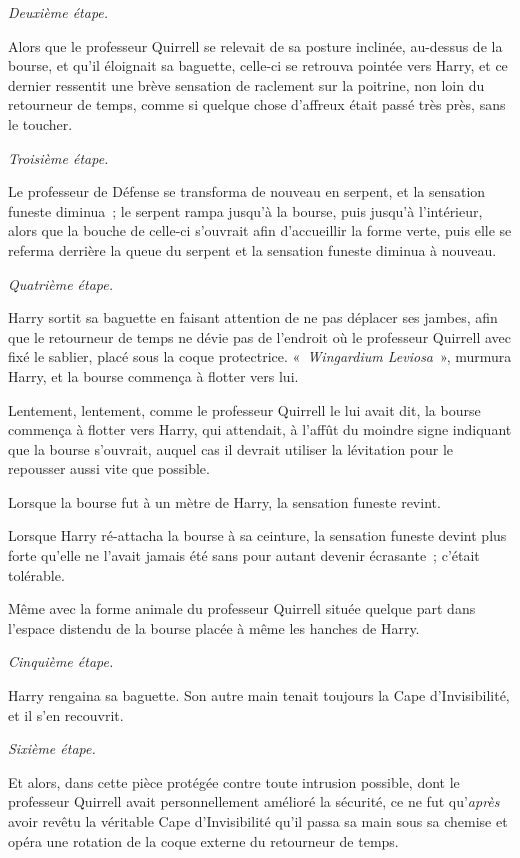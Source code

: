 \emph{Deuxième étape.}

Alors que le professeur Quirrell se relevait de sa posture inclinée, au-dessus de la bourse, et qu'il éloignait sa baguette, celle-ci se retrouva pointée vers Harry, et ce dernier ressentit une brève sensation de raclement sur la poitrine, non loin du retourneur de temps, comme si quelque chose d'affreux était passé très près, sans le toucher.

\emph{Troisième étape.}

Le professeur de Défense se transforma de nouveau en serpent, et la sensation funeste diminua~; le serpent rampa jusqu'à la bourse, puis jusqu'à l'intérieur, alors que la bouche de celle-ci s'ouvrait afin d'accueillir la forme verte, puis elle se referma derrière la queue du serpent et la sensation funeste diminua à nouveau.

\emph{Quatrième étape.}

Harry sortit sa baguette en faisant attention de ne pas déplacer ses jambes, afin que le retourneur de temps ne dévie pas de l'endroit où le professeur Quirrell avec fixé le sablier, placé sous la coque protectrice.
«~\emph{Wingardium Leviosa}~», murmura Harry, et la bourse commença à flotter vers lui.

Lentement, lentement, comme le professeur Quirrell le lui avait dit, la bourse commença à flotter vers Harry, qui attendait, à l'affût du moindre signe indiquant que la bourse s'ouvrait, auquel cas il devrait utiliser la lévitation pour le repousser aussi vite que possible.

Lorsque la bourse fut à un mètre de Harry, la sensation funeste revint.

Lorsque Harry ré-attacha la bourse à sa ceinture, la sensation funeste devint plus forte qu'elle ne l'avait jamais été sans pour autant devenir écrasante~; c'était tolérable.

Même avec la forme animale du professeur Quirrell située quelque part dans l'espace distendu de la bourse placée à même les hanches de Harry.

\emph{Cinquième étape.}

Harry rengaina sa baguette.
Son autre main tenait toujours la Cape d'Invisibilité, et il s'en recouvrit.

\emph{Sixième étape.}

Et alors, dans cette pièce protégée contre toute intrusion possible, dont le professeur Quirrell avait personnellement amélioré la sécurité, ce ne fut qu'\emph{après} avoir revêtu la véritable Cape d'Invisibilité qu'il passa sa main sous sa chemise et opéra une rotation de la coque externe du retourneur de temps.

